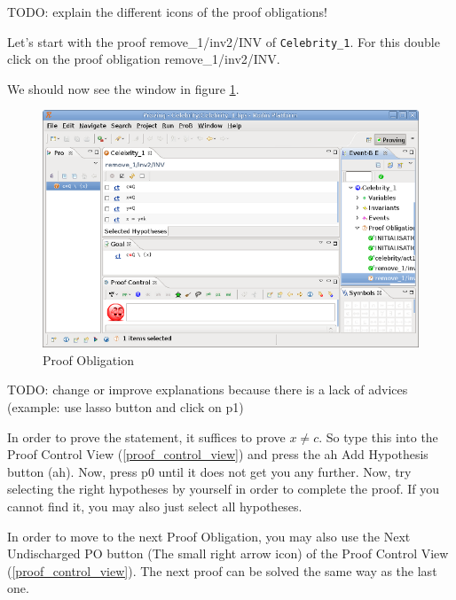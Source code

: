TODO: explain the different icons of the proof obligations!

Let's start with the proof \textsf{remove\_1/inv2/INV} of \texttt{Celebrity\_1}. For this double click on the proof obligation \textsf{remove\_1/inv2/INV}.


We should now see the window in figure \ref{fig_tut_08_proof_obligation}.

\begin{figure}[!h]
\begin{center}
	\includegraphics{img/tutorial/tut_08_proof2.png}
	\caption{Proof Obligation}
	\label{fig_tut_08_proof_obligation}
\end{center}
\end{figure}

TODO: change or improve explanations because there is a lack of advices (example: use lasso button and click on p1)

In order to prove the statement, it suffices to prove \textsf{$x \neq c$}. So type this into the \textsf{Proof Control View} (\ref{proof_control_view}) and press the ah \textsf{Add Hypothesis button (ah)}. Now, press \textsf{p0} until it does not get you any further. Now, try selecting the right hypotheses by yourself in order to complete the proof. If you cannot find it, you may also just select all hypotheses.

In order to move to the next Proof Obligation, you may also use the \textsf{Next Undischarged PO button (The small right arrow icon)} of the \textsf{Proof Control View} (\ref{proof_control_view}). The next proof can be solved the same way as the last one.

